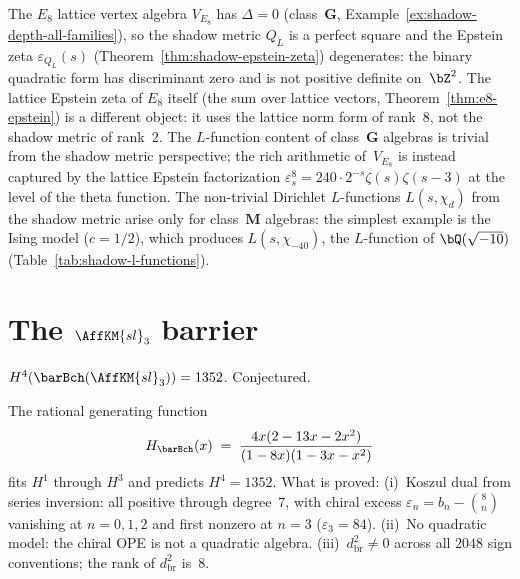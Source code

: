 \begin{remark}
\label{rem:comp-e8-epstein-degeneration}
The $E_8$ lattice vertex algebra $V_{E_8}$ has
$\Delta = 0$ (class~$\mathbf{G}$,
Example~\ref{ex:shadow-depth-all-families}),
so the shadow metric $Q_L$ is a perfect square and
the Epstein zeta $\varepsilon_{Q_L}(s)$
\textup{(}Theorem~\textup{\ref{thm:shadow-epstein-zeta}}\textup{)}
degenerates: the binary quadratic form has discriminant zero
and is not positive definite on~$\bZ^2$.
The lattice Epstein zeta of $E_8$ itself
\textup{(}the sum over lattice vectors,
Theorem~\textup{\ref{thm:e8-epstein}}\textup{)}
is a different object: it uses the lattice norm form of
rank~$8$, not the shadow metric of rank~$2$.
The $L$-function content of class~$\mathbf{G}$ algebras is
trivial from the shadow metric perspective; the rich arithmetic
of~$V_{E_8}$ is instead captured by the lattice Epstein
factorization
$\varepsilon^8_s = 240 \cdot 2^{-s}\zeta(s)\zeta(s{-}3)$
at the level of the theta function.
The non-trivial Dirichlet $L$-functions $L(s, \chi_d)$ from the
shadow metric arise only for class~$\mathbf{M}$ algebras:
the simplest example is the Ising model ($c = 1/2$),
which produces $L(s, \chi_{-40})$,
the $L$-function of $\bQ(\sqrt{-10})$
\textup{(}Table~\textup{\ref{tab:shadow-l-functions}}\textup{)}.
\end{remark}

\section{The $\AffKM{sl}_3$ barrier}
\label{sec:comp-sl3-barrier}

$H^4(\barBch(\AffKM{sl}_3)) = 1352$. Conjectured.

The rational generating function
\[
 H_{\barBch}(x) \;=\;
 \frac{4x(2 - 13x - 2x^2)}{(1-8x)(1-3x-x^2)}
\]
fits $H^1$ through $H^3$ and predicts $H^4 = 1352$. What is
proved: (i)~Koszul dual from series inversion: all positive
through degree~$7$, with chiral excess
$\varepsilon_n = b_n - \binom{8}{n}$ vanishing at
$n = 0, 1, 2$ and first nonzero at $n = 3$
($\varepsilon_3 = 84$). (ii)~No quadratic model: the chiral
OPE is not a quadratic algebra. (iii)~$d_{\mathrm{br}}^2 \neq 0$
across all $2048$ sign conventions; the rank of
$d_{\mathrm{br}}^2$ is~$8$.


